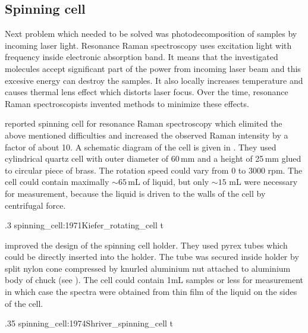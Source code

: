 \subsection{Spinning cell}

Next problem which needed to be solved was photodecomposition of samples by
incoming laser light. Resonance Raman spectroscopy uses excitation light
with frequency inside electronic absorption band. It means that the
investigated molecules accept significant part of the power from incoming
laser beam and this excesive energy can destroy the samples. It also locally
increases temperature and causes thermal lens effect which distorts laser
focus. Over the time, resonance Raman spectroscopists invented methods to
minimize these effects.

\textcite{Kiefer1971} reported spinning cell for resonance Raman spectroscopy
which elimited the above mentioned difficulties and increased the observed
Raman intensity by a factor of about 10. A schematic diagram of the cell is
given in
.
They used cylindrical quartz cell with outer diameter of 60\,mm and a height
of 25\,mm glued to circular piece of brass. The rotation speed could vary from
0 to 3000 rpm. The cell could contain maximally $\sim 65$\,mL of liquid, but
only $\sim 15$ mL were necessary for measurement, because the liquid is driven
to the walls of the cell by centrifugal force.

%
{.3}%
{spinning_cell:1971Kiefer_rotating_cell}%
{t}

\textcite{Shriver1974} improved the design of the spinning cell holder. They
used pyrex tubes which could be directly inserted into the holder. The tube
was secured inside holder by split nylon cone compressed by knurled aluminium
nut attached to aluminium body of chuck (see
).
The cell could contain 1mL samples or less for measurement in which case the
spectra were obtained from thin film of the liquid on the sides of the cell.

%
{.35}%
{spinning_cell:1974Shriver_spinning_cell}
{t}

